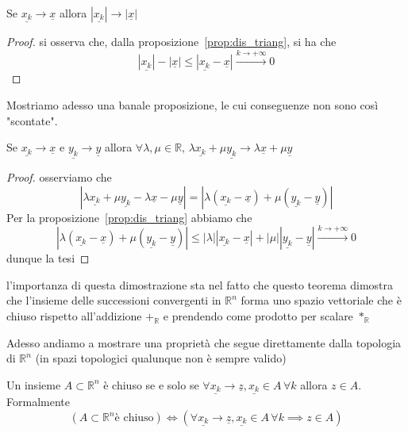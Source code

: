 \begin{prop}
Se $\underline{x_k} \to \underline{x}$ allora $|\underline{x_k}| \to |\underline{x}|$
\end{prop}
\begin{proof}
si osserva che, dalla proposizione~\ref{prop:dis_triang}, si ha che
$$
|\underline{x_k}| - |\underline{x}| \leq |\underline{x_k} - \underline{x}| \stackrel{k \to +\infty}{\to} 0
$$
\end{proof}
\noindent Mostriamo adesso una banale proposizione, le cui conseguenze non sono così "scontate".
\begin{prop}
Se $\underline{x_k} \to \underline{x}$ e $\underline{y_k} \to \underline{y}$ allora $\forall \lambda, \mu \in \mathbb{R}, \, \lambda \underline{x_k} + \mu \underline{y_k} \to \lambda \underline{x} + \mu \underline{y}$ 
\end{prop}
\begin{proof}
osserviamo che
$$
|\lambda \underline{x_k} + \mu \underline{y_k} - \lambda \underline{x} - \mu \underline{y}| = |\lambda (\underline{x_k} - \underline{x}) + \mu (\underline{y_k} - \underline{y})|
$$
Per la proposizione~\ref{prop:dis_triang} abbiamo che
$$
|\lambda (\underline{x_k} - \underline{x}) + \mu (\underline{y_k} - \underline{y})| \leq |\lambda| |\underline{x_k} - \underline{x}| + |\mu| |\underline{y_k} - \underline{y}| \stackrel{k \to +\infty}{\to} 0
$$
dunque la tesi
\end{proof}
\begin{remark}
l'importanza di questa dimostrazione sta nel fatto che questo teorema dimostra che l'insieme delle successioni convergenti in $\mathbb{R}^n$ forma uno spazio vettoriale che è chiuso rispetto all'addizione $+_{\mathbb{R}}$ e prendendo come prodotto per scalare $*_\mathbb{R}$
\end{remark}
\noindent Adesso andiamo a mostrare una proprietà che segue direttamente dalla topologia di $\mathbb{R}^n$ (in spazi topologici qualunque non è sempre valido)
\begin{prop}
	Un insieme $A \subset \mathbb{R}^n$ è chiuso se e solo se $\forall \underline{x_k} \to \underline{z}, \underline{x_k} \in A \, \forall k$ allora $z \in A$. Formalmente
	$$
	(A \subset \mathbb{R}^n \text{è chiuso}) \iff (\forall \underline{x_k} \to \underline{z}, \underline{x_k} \in A \, \forall k \implies z \in A) 
	$$
	\label{prop:caratt_chiusi}
\end{prop}
